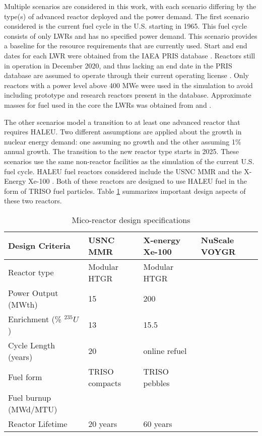 Multiple scenarios are considered in this work, with each scenario differing
by the type(s) of advanced reactor deployed and the power demand. The first 
scenario considered 
is the current fuel cycle in the U.S. starting in 1965. This fuel cycle 
consists of only \glspl{LWR}
and has no specified power demand. This scenario provides a baseline for 
the resource requirements that are currently used. Start and 
end dates for each \gls{LWR} were obtained from the \gls{IAEA} \gls{PRIS} database 
\cite{noauthor_power_1989}. Reactors still in operation in December 2020, and thus 
lacking an end date in the \gls{PRIS} database are assumed to operate through their 
current operating license 
\cite{noauthor_initial_2021,noauthor_second_2021,noauthor_watts_2021,noauthor_watts_2021-1,noauthor_clinton_2021,noauthor_comanche_2021,noauthor_comanche_2021-1,noauthor_perry_2021}. 
Only reactors with a power level above 400 MWe were used in the simulation 
to avoid including prototype and research reactors present in the database. 
Approximate masses for fuel used in the core the \gls{LWR}s was obtained 
from \cite{todreas_nuclear_2012} and \cite{cacuci_handbook_2010}. 

The other scenarios model a transition to at least one advanced reactor 
that requires \gls{HALEU}. Two different assumptions are applied about the growth 
in nuclear energy demand: one assuming no growth and the other assuming 
1\% annual growth. The transition to the new reactor type starts in 2025. 
These scenarios use the same  
non-reactor facilities as the simulation of the current 
U.S. fuel cycle. \gls{HALEU} fuel reactors 
considered include the \gls{USNC} \gls{MMR}
\cite{mitchell_usnc_2020} and the X-Energy Xe-100 
\cite{harlan_x-energy_2018}\cite{hussain_advances_2018}. Both of 
these reactors are designed 
to use \gls{HALEU} fuel in the form of \gls{TRISO} fuel particles. Table 
\ref{tab:reactor_summary} summarizes important design aspects of these two reactors.

\begin{table}[ht]
    \centering
    \caption{Mico-reactor design specifications}
    \label{tab:reactor_summary}
    \begin{tabular}{p{5cm}p{3cm}p{3cm}p{3cm}}
        \hline
        Design Criteria & \gls{USNC} \gls{MMR} & 
            X-energy Xe-100 & NuScale VOYGR \\\hline
        Reactor type & Modular HTGR & Modular HTGR & \\
        Power Output (MWth) & 15 & 200 & \\
        Enrichment (\% $^{235}U$) & 13 & 15.5 & \\
        Cycle Length (years) & 20 & online refuel &\\
        Fuel form & \gls{TRISO} compacts & \gls{TRISO} pebbles &\\
        Fuel burnup (MWd/MTU) & & & \\
        Reactor Lifetime & 20 years & 60 years & \\
        \hline
    \end{tabular}
\end{table}
    
